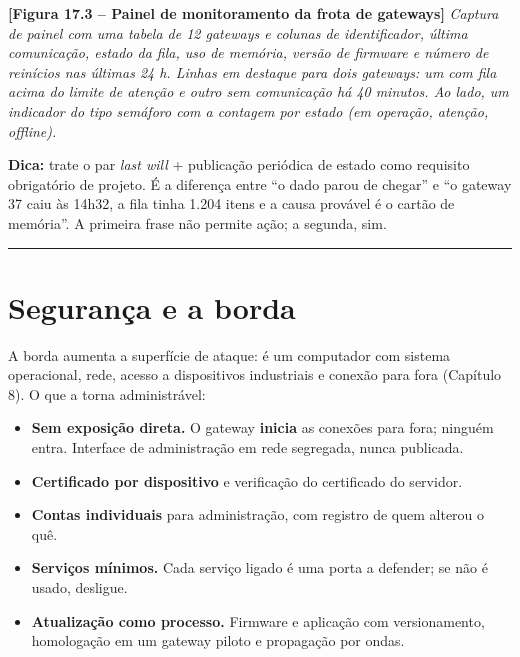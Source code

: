\begin{caixafigura}

\textbf{{[}Figura 17.3 -- Painel de monitoramento da frota de gateways{]}}
\emph{Captura de painel com uma tabela de 12 gateways e colunas de identificador, última comunicação, estado da fila, uso de memória, versão de firmware e número de reinícios nas últimas 24 h. Linhas em destaque para dois gateways: um com fila acima do limite de atenção e outro sem comunicação há 40 minutos. Ao lado, um indicador do tipo semáforo com a contagem por estado (em operação, atenção, offline).}

\end{caixafigura}

\begin{caixadica}

\textbf{Dica:} trate o par \emph{last will} + publicação periódica de estado como requisito obrigatório de
projeto. É a diferença entre ``o dado parou de chegar'' e ``o gateway 37 caiu às 14h32, a fila tinha
1.204 itens e a causa provável é o cartão de memória''. A primeira frase não permite ação; a
segunda, sim.

\end{caixadica}

\begin{center}\rule{0.5\linewidth}{0.5pt}\end{center}

\section{Segurança e a borda}\label{seguranuxe7a-e-a-borda}

A borda aumenta a superfície de ataque: é um computador com sistema operacional, rede, acesso a
dispositivos industriais e conexão para fora (Capítulo 8). O que a torna administrável:

\begin{itemize}
\tightlist
\item
  \textbf{Sem exposição direta.} O gateway \textbf{inicia} as conexões para fora; ninguém entra. Interface de
  administração em rede segregada, nunca publicada.
\item
  \textbf{Certificado por dispositivo} e verificação do certificado do servidor.
\item
  \textbf{Contas individuais} para administração, com registro de quem alterou o quê.
\item
  \textbf{Serviços mínimos.} Cada serviço ligado é uma porta a defender; se não é usado, desligue.
\item
  \textbf{Atualização como processo.} Firmware e aplicação com versionamento, homologação em um gateway
  piloto e propagação por ondas.
\end{itemize}

